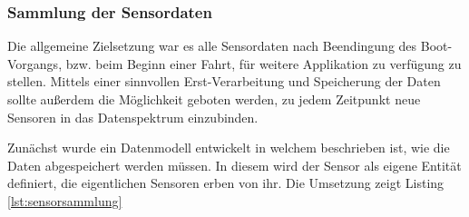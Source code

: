 \subsubsection{Sammlung der Sensordaten}
Die allgemeine Zielsetzung war es alle Sensordaten nach Beendingung des Boot-Vorgangs, bzw. beim Beginn einer Fahrt, für weitere Applikation zu verfügung zu stellen. Mittels einer sinnvollen Erst-Verarbeitung und Speicherung der Daten sollte außerdem die Möglichkeit geboten werden, zu jedem Zeitpunkt neue Sensoren in das Datenspektrum einzubinden.

Zunächst wurde ein Datenmodell entwickelt in welchem beschrieben ist, wie die Daten abgespeichert werden müssen. In diesem wird der Sensor als eigene Entität definiert, die eigentlichen Sensoren erben von ihr. Die Umsetzung zeigt Listing \ref{lst:sensorsammlung}


